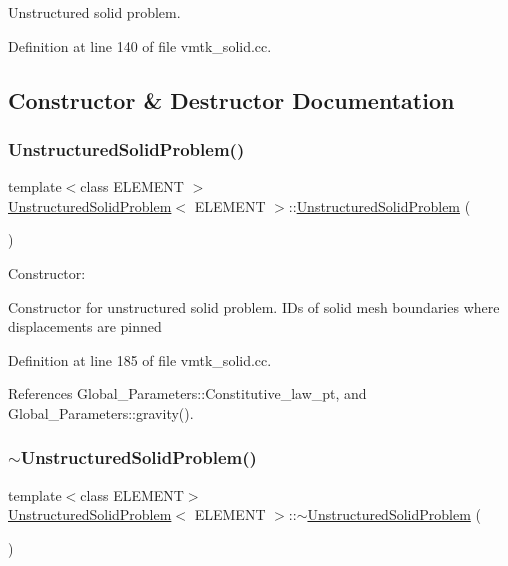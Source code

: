 Unstructured solid problem. 

Definition at line 140 of file vmtk\+\_\+solid.\+cc.



\subsection{Constructor \& Destructor Documentation}
\mbox{\label{classUnstructuredSolidProblem_a18ce02b6e4bbc86403c9e1b32c095772}} 
\subsubsection{\texorpdfstring{Unstructured\+Solid\+Problem()}{UnstructuredSolidProblem()}}
{\footnotesize\ttfamily template$<$class E\+L\+E\+M\+E\+NT $>$ \\
\hyperlink{classUnstructuredSolidProblem}{Unstructured\+Solid\+Problem}$<$ E\+L\+E\+M\+E\+NT $>$\+::\hyperlink{classUnstructuredSolidProblem}{Unstructured\+Solid\+Problem} (\begin{DoxyParamCaption}{ }\end{DoxyParamCaption})}



Constructor\+: 

Constructor for unstructured solid problem. I\+Ds of solid mesh boundaries where displacements are pinned 

Definition at line 185 of file vmtk\+\_\+solid.\+cc.



References Global\+\_\+\+Parameters\+::\+Constitutive\+\_\+law\+\_\+pt, and Global\+\_\+\+Parameters\+::gravity().

\mbox{\label{classUnstructuredSolidProblem_a25fe105d949498bf8f7c15aff96a7d00}} 
\subsubsection{\texorpdfstring{$\sim$\+Unstructured\+Solid\+Problem()}{~UnstructuredSolidProblem()}}
{\footnotesize\ttfamily template$<$class E\+L\+E\+M\+E\+NT$>$ \\
\hyperlink{classUnstructuredSolidProblem}{Unstructured\+Solid\+Problem}$<$ E\+L\+E\+M\+E\+NT $>$\+::$\sim$\hyperlink{classUnstructuredSolidProblem}{Unstructured\+Solid\+Problem} (\begin{DoxyParamCaption}{ }\end{DoxyParamCaption})\hspace{0.3cm}{\ttfamily [inline]}}



